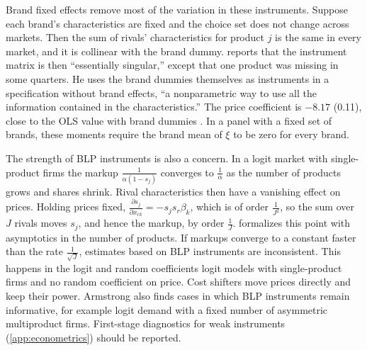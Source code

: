Brand fixed effects remove most of the variation in these instruments. Suppose each brand's characteristics are
fixed and the choice set does not change across markets. Then the sum of rivals' characteristics for product
$j$ is the same in every market, and it is collinear with the brand dummy. \citet[p.~320]{Nevo2001} reports that the
instrument matrix is then ``essentially singular,'' except that one product was missing in some quarters. He
uses the brand dummies themselves as instruments in a specification without brand effects, ``a nonparametric
way to use all the information contained in the characteristics.'' The price coefficient is $-8.17$ (0.11), close
to the OLS value with brand dummies \citep[Table V, col.~iv]{Nevo2001}. In a panel with a fixed set of brands,
these moments require the brand mean of $\xi$ to be zero for every brand.

The strength of BLP instruments is also a concern. In a logit market with single-product firms the markup
$\frac{1}{\alpha(1 - s_j)}$ converges to $\frac{1}{\alpha}$ as the number of products grows and shares shrink.
Rival characteristics then have a vanishing effect on prices. Holding prices fixed, $\frac{\partial
s_j}{\partial x_{rk}} = -s_js_r\beta_k$, which is of order $\frac{1}{J^2}$, so the sum over $J$ rivals moves
$s_j$, and hence the markup, by order $\frac{1}{J}$. \citet[Section~3]{Armstrong2016} formalizes this point with
asymptotics in the number of products. If markups converge to a constant faster than the rate $\frac{1}{\sqrt{J}}$,
estimates based on BLP instruments are inconsistent. This happens in the logit and random coefficients logit models
with single-product firms and no random coefficient on price. Cost shifters move prices directly and keep their
power. Armstrong also finds cases in which BLP instruments remain informative, for example logit demand with a fixed
number of asymmetric multiproduct firms. First-stage diagnostics for weak instruments (\cref{app:econometrics})
should be reported.

